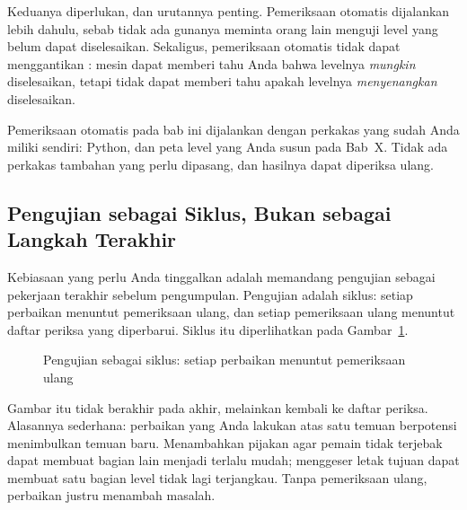 Keduanya diperlukan, dan urutannya penting. Pemeriksaan otomatis dijalankan
lebih dahulu, sebab tidak ada gunanya meminta orang lain menguji level yang
belum dapat diselesaikan. Sekaligus, pemeriksaan otomatis tidak dapat
menggantikan : mesin dapat memberi tahu Anda bahwa levelnya
\emph{mungkin} diselesaikan, tetapi tidak dapat memberi tahu apakah levelnya
\emph{menyenangkan} diselesaikan.

\begin{catatabox}
Pemeriksaan otomatis pada bab ini dijalankan dengan perkakas yang sudah Anda
miliki sendiri: Python, dan peta level yang Anda susun pada Bab~X. Tidak ada
perkakas tambahan yang perlu dipasang, dan hasilnya dapat diperiksa ulang.
\end{catatabox}

\subsection{Pengujian sebagai Siklus, Bukan sebagai Langkah Terakhir}

Kebiasaan yang perlu Anda tinggalkan adalah memandang pengujian sebagai
pekerjaan terakhir sebelum pengumpulan. Pengujian adalah siklus: setiap
perbaikan menuntut pemeriksaan ulang, dan setiap pemeriksaan ulang menuntut
daftar periksa yang diperbarui. Siklus itu diperlihatkan pada
Gambar~\ref{fig:siklus-uji}.

\begin{figure}[htbp]
\centering

\caption{Pengujian sebagai siklus: setiap perbaikan menuntut pemeriksaan ulang}
\label{fig:siklus-uji}
\end{figure}

Gambar itu tidak berakhir pada  akhir,
melainkan kembali ke daftar periksa. Alasannya sederhana: perbaikan yang Anda
lakukan atas satu temuan berpotensi menimbulkan temuan baru. Menambahkan
pijakan agar pemain tidak terjebak dapat membuat bagian lain menjadi terlalu
mudah; menggeser letak tujuan dapat membuat satu bagian level tidak lagi
terjangkau. Tanpa pemeriksaan ulang, perbaikan justru menambah masalah.
